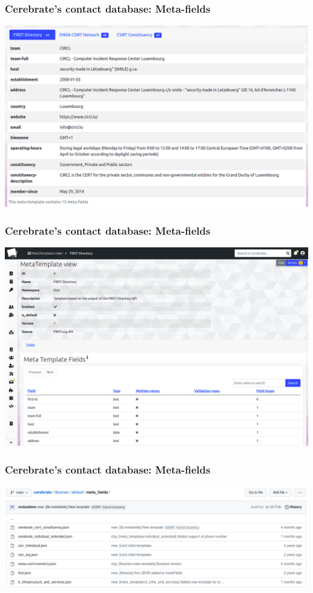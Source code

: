 \begin{frame}
\frametitle{Cerebrate's contact database: Meta-fields}
\begin{center}
    \includegraphics[width=0.99\linewidth]{pictures/meta-fields-first.png}
\end{center}
\end{frame}

\begin{frame}
\frametitle{Cerebrate's contact database: Meta-fields}
\begin{center}
    \includegraphics[width=0.99\linewidth]{pictures/meta-templates-first.png}
\end{center}
\end{frame}

\begin{frame}
\frametitle{Cerebrate's contact database: Meta-fields}
\begin{center}
    \includegraphics[width=0.99\linewidth]{pictures/meta-template-repo.png}
\end{center}
\end{frame}

